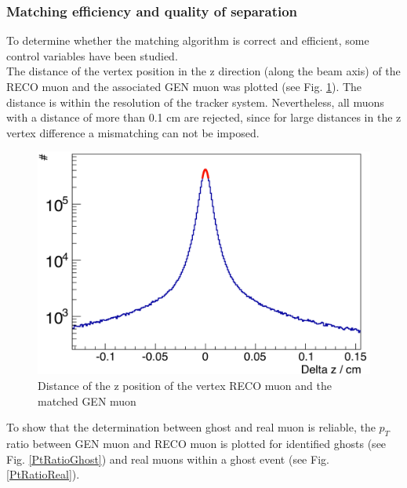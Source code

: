 \subsubsection{Matching efficiency and quality of separation}
To determine whether the matching algorithm is correct and efficient, some control variables have been studied.\\
The distance of the vertex position in the z direction (along the beam axis) of the RECO muon and the associated GEN muon was plotted (see Fig. \ref{DeltaZMatching}). The distance is within the resolution of the tracker system. Nevertheless, all muons with a distance of more than 0.1 cm are rejected, since for large distances in the z vertex difference a mismatching can not be imposed.\\
\begin{figure}[b]
\centering
\begin{minipage}[t]{0.95\textwidth}
\includegraphics[width=\textwidth]{Figures/scheuch/DeltaZ.png}
\caption{Distance of the z position of the vertex RECO muon and the matched GEN muon}
\label{DeltaZMatching}
\end{minipage}
\end{figure}
To show that the determination between ghost and real muon is reliable, the $p_{T}$ ratio between GEN muon and RECO muon is plotted for identified ghosts (see Fig. \ref{PtRatioGhost}) and real muons within a ghost event (see Fig. \ref{PtRatioReal}).
